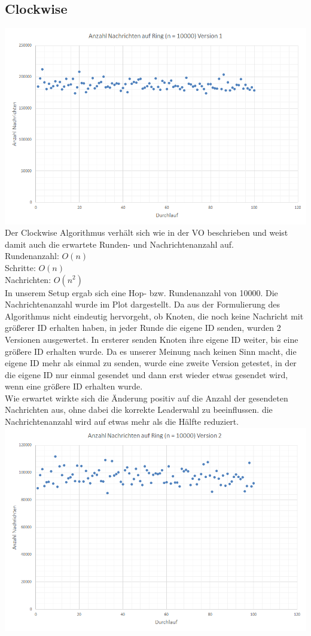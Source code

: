 \documentclass[12pt,a4paper]{report}
\begin{document}
\subsection*{Clockwise}
\includegraphics[width=\textwidth]{cw-1.png}
Der Clockwise Algorithmus verhält sich wie in der VO beschrieben und weist damit auch die erwartete Runden- und Nachrichtenanzahl auf.\\
Rundenanzahl: $O(n)$\\
Schritte: $O(n)$\\
Nachrichten: $O(n^2)$\\
In unserem Setup ergab sich eine Hop- bzw. Rundenanzahl von 10000. Die Nachrichtenanzahl wurde im Plot dargestellt.
Da aus der Formulierung des Algorithmus nicht eindeutig hervorgeht, ob Knoten, die noch keine Nachricht mit größerer ID erhalten haben,
in jeder Runde die eigene ID senden, wurden 2 Versionen ausgewertet. In ersterer senden Knoten ihre eigene ID weiter, bis eine
größere ID erhalten wurde. Da es unserer Meinung nach keinen Sinn macht, die eigene ID mehr als einmal zu senden, wurde eine zweite Version getestet, in der die eigene ID nur einmal gesendet und dann erst wieder etwas gesendet wird, wenn eine größere ID erhalten wurde.\\
Wie erwartet wirkte sich die Änderung positiv auf die Anzahl der gesendeten Nachrichten aus, ohne dabei die korrekte Leaderwahl zu
beeinflussen. die Nachrichtenanzahl wird auf etwas mehr als die Hälfte reduziert.\\
\includegraphics[width=\textwidth]{cw-2.png}
\end{document}
